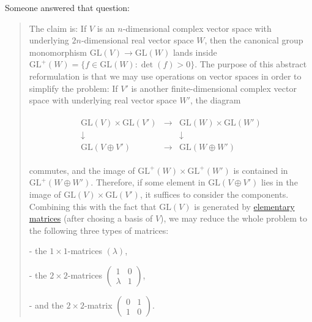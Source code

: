 \documentclass{article}
\numberwithin{equation}{subsection} %
\theoremstyle{definition}
\begin{document}
        Someone answered that question: 

        \begin{quote}
            The claim is: If $V$ is an $n$-dimensional complex vector space with underlying $2n$-dimensional real vector space $W$, then the canonical group monomorphism $\mathrm{GL}(V) \to \mathrm{GL}(W)$ lands inside $\mathrm{GL}^+(W)=\{f \in \mathrm{GL}(W) : \det(f)>0\}$.  The purpose of this abstract reformulation is that we may use operations on vector spaces in order to simplify the problem: If $V'$ is another finite-dimensional complex vector space with underlying real vector space $W'$, the diagram

            \begin{align}
              \begin{array}{ccc} 
                \mathrm{GL}(V) \times \mathrm{GL}(V') & \rightarrow & \mathrm{GL}(W) \times \mathrm{GL}(W') \\
                \downarrow & & \downarrow \\ 
                \mathrm{GL}(V \oplus V') & \rightarrow & \mathrm{GL}(W \oplus W') 
              \end{array}
            \end{align}

            commutes, and the image of $\mathrm{GL}^+(W) \times \mathrm{GL}^+(W')$  is contained in $\mathrm{GL}^+(W \oplus W')$. Therefore, if some element in $\mathrm{GL}(V \oplus V')$ lies in the image of $\mathrm{GL}(V) \times \mathrm{GL}(V')$, it suffices to consider the components. Combining this with the fact that $\mathrm{GL}(V)$ is generated by \href{https://en.wikipedia.org/wiki/Elementary_matrix}{elementary matrices} (after chosing a basis of $V$), we may reduce the whole problem to the following three types of matrices:

            - the $1 \times 1$-matrices $(\lambda)$,

            - the $2 \times 2$-matrices $\begin{pmatrix} 1 & 0 \\ \lambda & 1 \end{pmatrix}$,

            - and the $2 \times 2$-matrix $\begin{pmatrix} 0 & 1 \\ 1 & 0 \end{pmatrix}$.


\end{quote}
\end{document}
